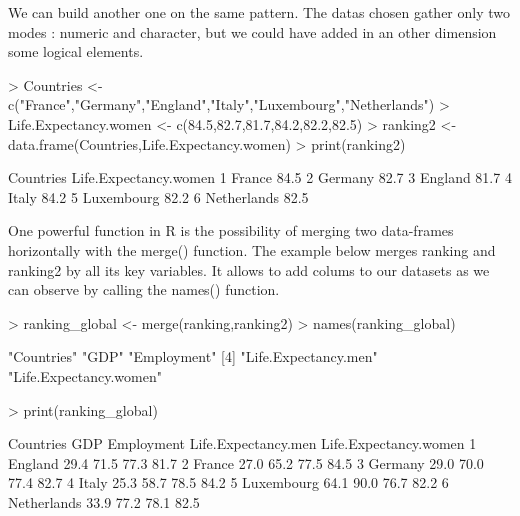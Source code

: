 \documentclass{article}
\begin{document}
We can build another one on the same pattern. The datas chosen gather only two modes : numeric and character, but we could have added in an other dimension some logical elements.
\begin{Schunk}
\begin{Sinput}
> Countries <- c("France","Germany","England","Italy","Luxembourg","Netherlands")
> Life.Expectancy.women <- c(84.5,82.7,81.7,84.2,82.2,82.5)
> ranking2 <- data.frame(Countries,Life.Expectancy.women)
> print(ranking2)
\end{Sinput}
\begin{Soutput}
    Countries Life.Expectancy.women
1      France                  84.5
2     Germany                  82.7
3     England                  81.7
4       Italy                  84.2
5  Luxembourg                  82.2
6 Netherlands                  82.5
\end{Soutput}
\end{Schunk}

One powerful function in R is the possibility of merging two data-frames horizontally with the merge() function. The example below merges ranking and ranking2 by all its key variables. It allows to add colums to our datasets as we can observe by calling the names() function.
\begin{Schunk}
\begin{Sinput}
> ranking_global <- merge(ranking,ranking2)
> names(ranking_global)
\end{Sinput}
\begin{Soutput}
[1] "Countries"             "GDP"                   "Employment"           
[4] "Life.Expectancy.men"   "Life.Expectancy.women"
\end{Soutput}
\begin{Sinput}
> print(ranking_global)
\end{Sinput}
\begin{Soutput}
    Countries  GDP Employment Life.Expectancy.men Life.Expectancy.women
1     England 29.4       71.5                77.3                  81.7
2      France 27.0       65.2                77.5                  84.5
3     Germany 29.0       70.0                77.4                  82.7
4       Italy 25.3       58.7                78.5                  84.2
5  Luxembourg 64.1       90.0                76.7                  82.2
6 Netherlands 33.9       77.2                78.1                  82.5
\end{Soutput}
\end{Schunk}
\end{document}
